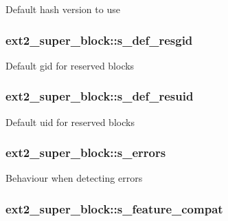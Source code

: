 \-Default hash version to use \hypertarget{structext2__super__block_a2973f6cda59f008e1f649c6d68ddafd6}{
\subsubsection[{s\-\_\-def\-\_\-resgid}]{ {\bf ext2\-\_\-super\-\_\-block\-::s\-\_\-def\-\_\-resgid}}}\label{structext2__super__block_a2973f6cda59f008e1f649c6d68ddafd6}
\-Default gid for reserved blocks \hypertarget{structext2__super__block_a83da108c4a1f27a275f54970fb8edf07}{
\subsubsection[{s\-\_\-def\-\_\-resuid}]{ {\bf ext2\-\_\-super\-\_\-block\-::s\-\_\-def\-\_\-resuid}}}\label{structext2__super__block_a83da108c4a1f27a275f54970fb8edf07}
\-Default uid for reserved blocks \hypertarget{structext2__super__block_a06e31d621f6250d56d1af5c342220a08}{
\subsubsection[{s\-\_\-errors}]{ {\bf ext2\-\_\-super\-\_\-block\-::s\-\_\-errors}}}\label{structext2__super__block_a06e31d621f6250d56d1af5c342220a08}
\-Behaviour when detecting errors \hypertarget{structext2__super__block_a1cf404a1bcfb748e924c62032cd723a5}{
\subsubsection[{s\-\_\-feature\-\_\-compat}]{ {\bf ext2\-\_\-super\-\_\-block\-::s\-\_\-feature\-\_\-compat}}}\label{structext2__super__block_a1cf404a1bcfb748e924c62032cd723a5}
